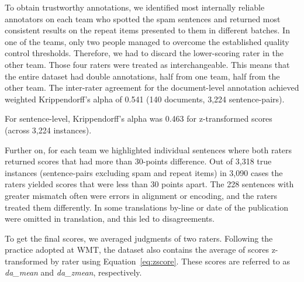 To obtain trustworthy annotations, we identified most internally reliable annotators on each team who spotted the spam sentences and returned most consistent results on the repeat items presented to them in different batches. In one of the teams, only two people managed to overcome the established quality control thresholds. Therefore, we had to discard the lower-scoring rater in the other team. Those four raters were treated as interchangeable. This means that the entire dataset had double annotations, half from one team, half from the other team.
The inter-rater agreement for the document-level annotation achieved weighted Krippendorff's alpha of 0.541 (140 documents, 3,224 sentence-pairs).

For sentence-level, Krippendorff's alpha was 0.463 for z-transformed scores (across 3,224 instances). %

Further on, for each team we highlighted individual sentences where both raters returned scores that had more than 30-points difference. Out of 3,318 true instances (sentence-pairs excluding spam and repeat items) in 3,090 cases the raters yielded scores that were less than 30 points apart.
The 228 sentences with greater mismatch often were errors in alignment or encoding, and the raters treated them differently. In some translations by-line or date of the publication were omitted in translation, and this led to disagreements. 

\label{pg:final_da}
To get the final scores, we averaged judgments of two raters. Following the practice adopted at \gls{WMT}, the dataset also contains the average of scores z-transformed by rater using Equation~\ref{eq:zscore}. These scores are referred to as \textit{da\_mean} and \textit{da\_zmean}, respectively.

